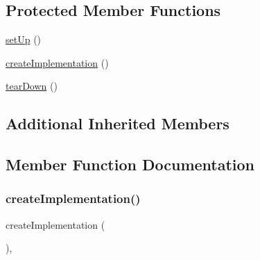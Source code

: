 \subsection*{Protected Member Functions}
\begin{DoxyCompactItemize}
\item 
\mbox{\hyperlink{class_sebastian_bergmann_1_1_diff_1_1_l_c_s_1_1_longest_common_subsequence_test_a0bc688732d2b3b162ffebaf7812e78da}{set\+Up}} ()
\item 
\mbox{\hyperlink{class_sebastian_bergmann_1_1_diff_1_1_l_c_s_1_1_longest_common_subsequence_test_a18a73c48948433fffa13061d1e7a35f1}{create\+Implementation}} ()
\item 
\mbox{\hyperlink{class_sebastian_bergmann_1_1_diff_1_1_l_c_s_1_1_longest_common_subsequence_test_a80fe3d17e658907fc75346a0ec9d6fc7}{tear\+Down}} ()
\end{DoxyCompactItemize}
\subsection*{Additional Inherited Members}


\subsection{Member Function Documentation}
\mbox{\label{class_sebastian_bergmann_1_1_diff_1_1_l_c_s_1_1_longest_common_subsequence_test_a18a73c48948433fffa13061d1e7a35f1}} 
\subsubsection{\texorpdfstring{create\+Implementation()}{createImplementation()}}
{\footnotesize\ttfamily create\+Implementation (\begin{DoxyParamCaption}{ }\end{DoxyParamCaption})\hspace{0.3cm}{\ttfamily [abstract]}, {\ttfamily [protected]}}

